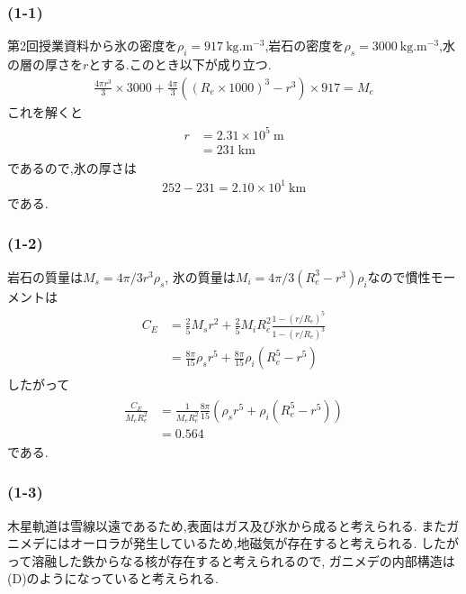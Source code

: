\subsubsection*{(1-1)}
第2回授業資料から氷の密度を$\rho_i=917\ \si{\kilo\gram.\metre^{-3}}$,岩石の密度を$\rho_s=3000\ \si{\kilo\gram.\metre^{-3}}$,水の層の厚さを$r$とする.このとき以下が成り立つ.
\begin{align}
  \frac{4\pi r^3}{3}\times3000+\frac{4\pi}{3}\left((R_e\times1000)^3-r^3\right)\times917=M_e
\end{align}
これを解くと
\begin{align}
  \begin{split}
    r&=2.31\times10^5\ \si{\metre}\\
    &=231\ \si{\kilo\metre}
  \end{split}
\end{align}
であるので,氷の厚さは
\begin{align}
  252-231=2.10\times10^1\ \si{\kilo\metre}
\end{align}
である.
\subsubsection*{(1-2)}
岩石の質量は$M_s=4\pi/3r^3\rho_s$, 氷の質量は$M_i=4\pi/3(R_e^3-r^3)\rho_i$なので慣性モーメントは
\begin{align}
  \begin{split}
    C_E&=\frac{2}{5}M_s r^2+\frac{2}{5}M_i R_e^2\frac{1-(r/R_e)^5}{1-(r/R_e)^3}\\
    &=\frac{8\pi}{15}\rho_s r^5+\frac{8\pi}{15}\rho_i(R_e^5-r^5)
  \end{split}
\end{align}
したがって
\begin{align}
  \begin{split}
    \frac{C_E}{M_eR_e^2}&=\frac{1}{M_eR_e^2}\frac{8\pi}{15}\left(\rho_sr^5+\rho_i(R_e^5-r^5)\right)\\
    &=0.564
  \end{split}
\end{align}
である.
\subsubsection*{(1-3)}
木星軌道は雪線以遠であるため,表面はガス及び氷から成ると考えられる.
またガニメデにはオーロラが発生しているため,地磁気が存在すると考えられる.\cite{rikanenpyo-aurora:online}
したがって溶融した鉄からなる核が存在すると考えられるので,
ガニメデの内部構造は(D)のようになっていると考えられる.